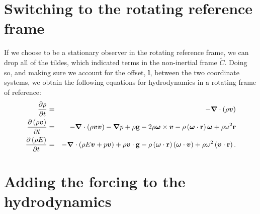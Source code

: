 \section{Switching to the rotating reference frame}
If we choose to be a stationary observer in the rotating reference
frame, we can drop all of the tildes, which indicated terms in the
non-inertial frame \(\widetilde{C}\).  Doing so, and making sure we
account for the offset, \(\boldsymbol{l}\), between the two coordinate systems, we obtain
the following equations for hydrodynamics in a rotating frame of
reference:
  \begin{eqnarray}
    \frac{\partial\rho}{\partial t} &=& -\boldsymbol{\nabla}\cdot\left(\rho\boldsymbol{v}\right) \label{eq:cont-rot-switch} \\
    \frac{\partial \left(\rho\boldsymbol{v}\right)}{\partial t} &=& -\boldsymbol{\nabla}\cdot\left(\rho\boldsymbol{v}\boldsymbol{v}\right) - \boldsymbol{\nabla} p + \rho{\bf g} - 2\rho\boldsymbol{\omega}\times\boldsymbol{v} - \rho\left(\boldsymbol{\omega}\cdot{\bf r}\right)\boldsymbol{\omega} + \rho\omega^2{\bf r} \label{eq:mom-rot-switch} \\
    \frac{\partial\left(\rho E\right)}{\partial t} &=& -\boldsymbol{\nabla}\cdot\left(\rho E\boldsymbol{v} + p\boldsymbol{v}\right) + \rho\boldsymbol{v}\cdot{\bf g} - \rho\left(\boldsymbol{\omega}\cdot{\bf r}\right)\left(\boldsymbol{\omega}\cdot\boldsymbol{v}\right) + \rho\omega^2\left(\boldsymbol{v}\cdot{\bf r}\right). \label{eq:etot-rot-switch}
  \end{eqnarray}

\section{Adding the forcing to the hydrodynamics}

